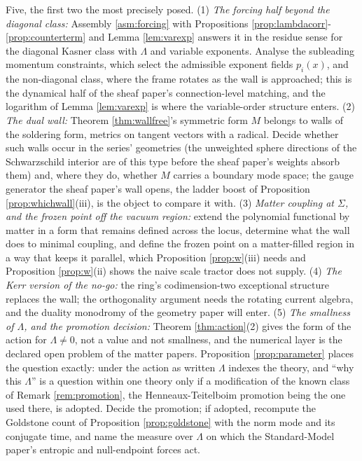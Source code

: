 \documentclass[11pt]{article}
\theoremstyle{definition}
\begin{document}
Five, the first two the most precisely posed. (1) \emph{The forcing half beyond the diagonal class:} Assembly \ref{asm:forcing} with Propositions \ref{prop:lambdacorr}-\ref{prop:counterterm} and Lemma \ref{lem:varexp} answers it in the residue sense for the diagonal Kasner class with $\Lambda$ and variable exponents. Analyse the subleading momentum constraints, which select the admissible exponent fields $p_i(x)$, and the non-diagonal class, where the frame rotates as the wall is approached; this is the dynamical half of the sheaf paper's connection-level matching, and the logarithm of Lemma \ref{lem:varexp} is where the variable-order structure enters. (2) \emph{The dual wall:} Theorem \ref{thm:wallfree}'s symmetric form $M$ belongs to walls of the soldering form, metrics on tangent vectors with a radical. Decide whether such walls occur in the series' geometries (the unweighted sphere directions of the Schwarzschild interior are of this type before the sheaf paper's weights absorb them) and, where they do, whether $M$ carries a boundary mode space; the gauge generator the sheaf paper's wall opens, the ladder boost of Proposition \ref{prop:whichwall}(iii), is the object to compare it with. (3) \emph{Matter coupling at $\Sigma$, and the frozen point off the vacuum region:} extend the polynomial functional by matter in a form that remains defined across the locus, determine what the wall does to minimal coupling, and define the frozen point on a matter-filled region in a way that keeps it parallel, which Proposition \ref{prop:w}(iii) needs and Proposition \ref{prop:w}(ii) shows the naive scale tractor does not supply. (4) \emph{The Kerr version of the no-go:} the ring's codimension-two exceptional structure replaces the wall; the orthogonality argument needs the rotating current algebra, and the duality monodromy of the geometry paper will enter. (5) \emph{The smallness of $\Lambda$, and the promotion decision:} Theorem \ref{thm:action}(2) gives the form of the action for $\Lambda \neq 0$, not a value and not smallness, and the numerical layer is the declared open problem of the matter papers. Proposition \ref{prop:parameter} places the question exactly: under the action as written $\Lambda$ indexes the theory, and ``why this $\Lambda$'' is a question within one theory only if a modification of the known class of Remark \ref{rem:promotion}, the Henneaux-Teitelboim promotion being the one used there, is adopted. Decide the promotion; if adopted, recompute the Goldstone count of Proposition \ref{prop:goldstone} with the norm mode and its conjugate time, and name the measure over $\Lambda$ on which the Standard-Model paper's entropic and null-endpoint forces act.
\end{document}
